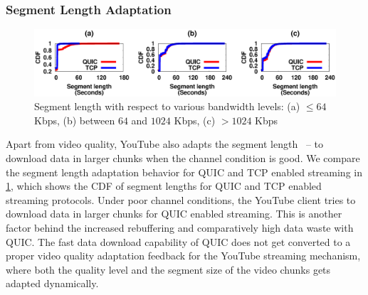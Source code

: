\subsubsection{Segment Length Adaptation}

\begin{figure}[!t]
	\captionsetup[subfigure]{}
	\begin{center}
        \includegraphics[width=\linewidth]{img/plotdata/CDF/Segment/plot_segment_bucket123}
		\caption{\label{fig:segment}Segment length with respect to various bandwidth levels: (a) $\leq 64$ Kbps, (b)  between $64$ and $1024$ Kbps, (c) $> 1024$ Kbps}
	\end{center}
\end{figure}


Apart from video quality, YouTube also adapts the segment length~\cite{mondal2017youtube} -- to download data in larger chunks when the channel condition is good. We compare the segment length adaptation behavior for QUIC and TCP enabled streaming in \fig\ref{fig:segment}, which shows the CDF of segment lengths for QUIC and TCP enabled streaming protocols. 
Under poor channel conditions, the YouTube client tries to download data in larger chunks for QUIC enabled streaming. This is another factor behind the increased rebuffering and comparatively high data waste with QUIC. The fast data download capability of QUIC does not get converted to a proper video quality adaptation feedback for the YouTube streaming mechanism, where both the quality level and the segment size of the video chunks gets adapted dynamically. 

